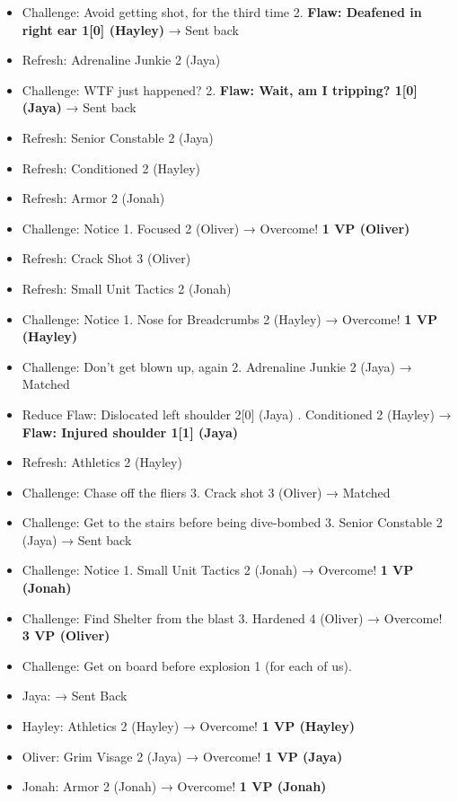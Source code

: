 \begin{itemize}
\item Challenge: Avoid getting shot, for the third time 2.  \textbf{ {\color[RGB]{255,0,0}Flaw: Deafened in right ear 1{[}0{]} (Hayley)} } → Sent back
\item Refresh: Adrenaline Junkie 2 (Jaya)
\item Challenge: WTF just happened? 2. \textbf{ {\color[RGB]{255,0,0}Flaw: Wait, am I tripping? 1{[}0{]} (Jaya)} } → Sent back
\item Refresh: Senior Constable 2 (Jaya)
\item Refresh: Conditioned 2 (Hayley)
\item Refresh: Armor 2 (Jonah)
\item Challenge: Notice 1. Focused 2 (Oliver) → Overcome! \textbf{1 VP (Oliver)}
\item Refresh: Crack Shot 3 (Oliver)
\item Refresh: Small Unit Tactics 2 (Jonah)
\item Challenge: Notice 1. Nose for Breadcrumbs 2 (Hayley) → Overcome! \textbf{1 VP (Hayley)}
\item Challenge: Don't get blown up, again 2. Adrenaline Junkie 2 (Jaya) → Matched
\item  {\color[RGB]{255,0,0}Reduce Flaw: Dislocated left shoulder 2{[}0{]} (Jaya)} .  Conditioned 2 (Hayley) → \textbf{ {\color[RGB]{255,0,0}Flaw: Injured shoulder 1{[}1{]} (Jaya)} }
\item Refresh: Athletics 2 (Hayley)
\item Challenge: Chase off the fliers 3. Crack shot 3 (Oliver) → Matched
\item Challenge: Get to the stairs before being dive-bombed 3. Senior Constable 2 (Jaya) → Sent back
\item Challenge: Notice 1.  Small Unit Tactics 2 (Jonah) → Overcome! \textbf{1 VP (Jonah)}
\item Challenge: Find Shelter from the blast 3. Hardened 4 (Oliver) → Overcome! \textbf{3 VP (Oliver)}
\item Challenge: Get on board before explosion 1 (for each of us).
\end{itemize}

\begin{itemize}
\item Jaya: → Sent Back
\item Hayley: Athletics 2 (Hayley) → Overcome! \textbf{1 VP (Hayley)}
\item Oliver: Grim Visage 2 (Jaya) → Overcome! \textbf{1 VP (Jaya)}
\item Jonah: Armor 2 (Jonah) → Overcome! \textbf{1 VP (Jonah)}
\end{itemize}

